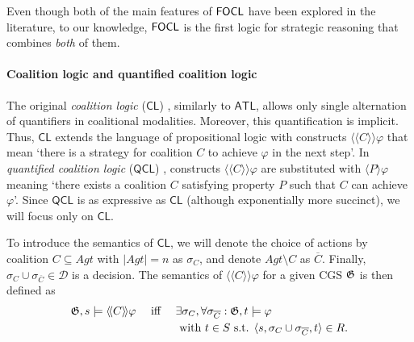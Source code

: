 \documentclass{article}
\begin{document}
Even though both of the main features of $\mathsf{FOCL}$ have been explored in the literature, to our knowledge, $\mathsf{FOCL}$ is the first logic for strategic reasoning that combines \textit{both} of them. %




 \paragraph{Coalition logic and quantified coalition logic} The original \textit{coalition logic} ($\mathsf{CL}$) \cite{pauly02}, similarly to $\mathsf{ATL}$, allows only single alternation of quantifiers in coalitional modalities. Moreover, this quantification is implicit. Thus, $\mathsf{CL}$ extends the language of propositional logic with constructs $\langle \! \langle C \rangle \! \rangle \varphi$ that mean `there is a strategy for coalition $C$ to achieve $\varphi$ in the next step'. %
 In \textit{quantified coalition logic} ($\mathsf{QCL}$) \cite{agotnes08}, constructs $\langle \! \langle C \rangle \! \rangle \varphi$ are substituted with $\langle P \rangle \varphi$ meaning `there exists a coalition $C$ satisfying property $P$ such that $C$ can achieve $\varphi$'. Since $\mathsf{QCL}$ is as expressive as $\mathsf{CL}$ (although exponentially more succinct), we will focus only on $\mathsf{CL}$. 
 
 To introduce the semantics of $\mathsf{CL}$, we will denote the choice of actions by coalition $C \subseteq Agt$ with $|Agt| = n$ as $\sigma_C$, and denote $Agt \setminus C$ as $\overline{C}$. Finally, $\sigma_C \cup \sigma_{{\overline{C}}} \in \mathcal{D}$ is a decision. The semantics of $\langle \! \langle C \rangle \! \rangle \varphi$ for a given CGS $\mathfrak{G}$ is then defined as 
  \begin{alignat*}{3}
        &\mathfrak{G},s \models \langle \! \langle C \rangle \! \rangle \varphi && \text{ iff } && \exists \sigma_C, \forall \sigma_{\overline{C}} : \mathfrak{G},t \models \varphi \\
        & && &&\text{ with } t \in S \text{ s.t. } \langle s, \sigma_C \cup \sigma_{\overline{C}}, t \rangle \in R.   
\end{alignat*}     
 
\end{document}
